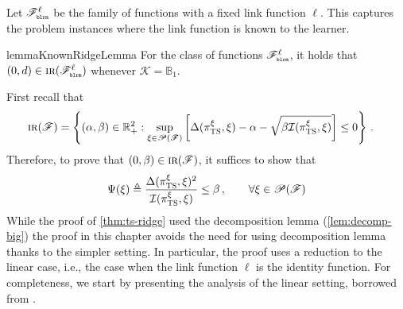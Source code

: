 \documentclass[letter, 12pt]{report}
\newcommand{\pr}{\text{\tiny\texttt{r}}}
\newcommand{\pb}{\text{\tiny\texttt{b}}}
\newcommand{\pl}{\text{\tiny\texttt{l}}}
\renewcommand{\pm}{\text{\tiny\texttt{m}}}
\newcommand{\R}{\mathbb R}
\newcommand{\explan}[1]{\stackrel{\text{\tiny \texttt{#1}}}}
\newcommand{\ball}{\mathbb{B}}
\newcommand{\cK}{\mathcal K}
\newcommand{\sF}{\mathscr F}
\newcommand{\sP}{\mathscr P}
\newcommand{\I}{\mathcal{I}}
\newcommand{\1}{\mathbf{1}}
\newcommand{\IR}{\operatorname{\textsc{ir}}}
\newcommand{\ts}{\textsc{TS}\xspace}
\theoremstyle{plain}
\theoremstyle{definition}
\theoremstyle{remark}
\begin{document}
Let $\sF^{\ell}_{\pb\pl\pr\pm}$ be the family of functions with a fixed link function $\ell$. This captures the problem instances where the link function is known to the learner.
\begin{restatable}{lemma}{KnownRidgeLemma}\label{thm:ridge-known-ir}
    For the class of functions $\sF^{\ell}_{\pb\pl\pr\pm}$,
    it holds that $(0, d) \in \IR(\sF^{\ell}_{\pb\pl\pr\pm})$ whenever $\cK = \ball_1$.
\end{restatable}
First recall that
\begin{align}
    \IR(\sF)
     & = \left\{(\alpha, \beta) \in \R_+^2 : \sup_{\xi \in \sP(\sF)} \left[\Delta(\pi^\xi_\ts, \xi) - \alpha - \sqrt{\beta \I(\pi^\xi_\ts, \xi)}\right] \leq 0 \right\}\,. \nonumber
\end{align}
Therefore, to prove that $(0, \beta) \in \IR(\sF)$, it suffices to show that
\begin{align}
    \Psi(\xi) \triangleq
    \frac{\Delta(\pi^\xi_\ts, \xi)^2}{\I(\pi^\xi_\ts, \xi)} \leq \beta\,,\qquad \forall \xi \in \sP(\sF)
    \label{eq:IR-alpha-0}
\end{align}
While the proof of \cref{thm:ts-ridge} used the decomposition lemma (\cref{lem:decomp-big}) the proof in this chapter avoids the need for using decomposition lemma thanks to the simpler setting.
In particular, the proof uses a reduction to the linear case, i.e., the case when the link function $\ell$ is the identity function.
For completeness, we start by presenting the analysis of the linear setting, borrowed from \cite{RV16}.
\end{document}
